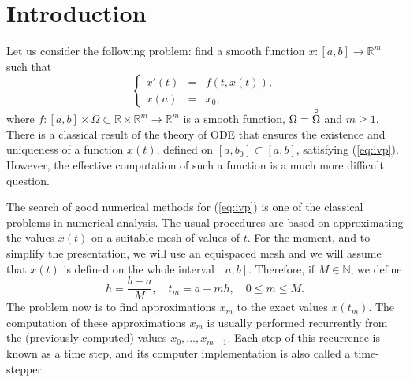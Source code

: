 \documentclass[12pt,twoside]{article}
\newcommand{\NN}{{\mathbb N}}               %
\newcommand{\RR}{{\mathbb R}}               %
\newcommand{\interior}[1]{\mbox{\raisebox{0.2ex}{$\stackrel{\circ}{#1}$}}}
\begin{document}
\section{Introduction}
Let us consider the following problem: find a smooth function
$x:[a,b]\rightarrow\RR^m$ such that
\begin{equation}
\left\{
\begin{array}{lcl}
x'(t) & = & f(t,x(t)), \\
x(a) & = &x_0,
\end{array}
\right.
\label{eq:ivp}
\end{equation}
where $f:[a,b]\times\Omega\subset\RR\times\RR^m\rightarrow\RR^m$ is a
smooth function, $\Omega=\interior{\Omega}$ and $m\ge 1$. There is a
classical result of the theory of ODE that ensures the existence and
uniqueness of a function $x(t)$, defined on $[a,b_0]\subset[a,b]$,
satisfying (\ref{eq:ivp}). However, the effective computation of such
a function is a much more difficult question.

The search of good numerical methods for (\ref{eq:ivp}) is one of the
classical problems in numerical analysis. The usual procedures are
based on approximating the values $x(t)$ on a suitable mesh of values
of $t$. For the moment, and to simplify the presentation, we will use
an equispaced mesh and we will assume that $x(t)$ is defined on the
whole interval $[a,b]$. Therefore, if $M\in\NN$, we define
\[
h=\frac{b-a}{M},\quad t_m=a+mh,\quad 0\le m\le M.
\]
The problem now is to find approximations $x_m$ to the exact values
$x(t_m)$. The computation of these approximations $x_m$ is usually
performed recurrently from the (previously computed) values
$x_0,\ldots,x_{m-1}$. Each step of this recurrence is known as a time
step, and its computer implementation is also called a time-stepper.
\end{document}
